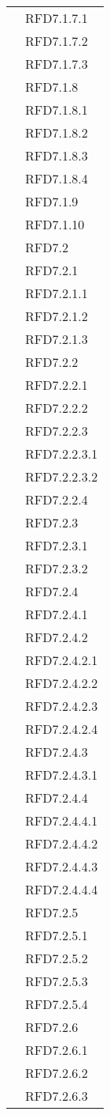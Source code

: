\begin{longtable}{|>{\centering}m{10cm}|m{3cm}<{\centering}|}
& RFD7.1.7.1\\
& RFD7.1.7.2\\
& RFD7.1.7.3\\
& RFD7.1.8\\
& RFD7.1.8.1\\
& RFD7.1.8.2\\
& RFD7.1.8.3\\
& RFD7.1.8.4\\
& RFD7.1.9\\
& RFD7.1.10\\
& RFD7.2\\
& RFD7.2.1\\
& RFD7.2.1.1\\
& RFD7.2.1.2\\
& RFD7.2.1.3\\
& RFD7.2.2\\
& RFD7.2.2.1\\
& RFD7.2.2.2\\
& RFD7.2.2.3\\
& RFD7.2.2.3.1\\
& RFD7.2.2.3.2\\
& RFD7.2.2.4\\
& RFD7.2.3\\
& RFD7.2.3.1\\
& RFD7.2.3.2\\
& RFD7.2.4\\
& RFD7.2.4.1\\
& RFD7.2.4.2\\
& RFD7.2.4.2.1\\
& RFD7.2.4.2.2\\
& RFD7.2.4.2.3\\
& RFD7.2.4.2.4\\
& RFD7.2.4.3\\
& RFD7.2.4.3.1\\
& RFD7.2.4.4\\
& RFD7.2.4.4.1\\
& RFD7.2.4.4.2\\
& RFD7.2.4.4.3\\
& RFD7.2.4.4.4\\
& RFD7.2.5\\
& RFD7.2.5.1\\
& RFD7.2.5.2\\
& RFD7.2.5.3\\
& RFD7.2.5.4\\
& RFD7.2.6\\
& RFD7.2.6.1\\
& RFD7.2.6.2\\
& RFD7.2.6.3\\

\end{longtable}
